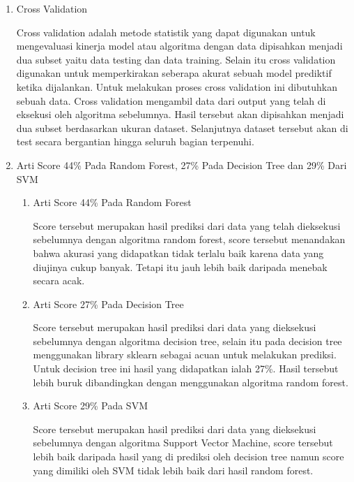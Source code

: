 \begin{enumerate}
\item Cross Validation \par
Cross validation adalah metode statistik yang dapat digunakan untuk mengevaluasi kinerja model atau algoritma dengan data dipisahkan menjadi dua subset yaitu data testing dan data training. Selain itu cross validation digunakan untuk memperkirakan seberapa akurat sebuah model prediktif ketika dijalankan. Untuk melakukan proses cross validation ini dibutuhkan sebuah data. Cross validation mengambil data dari output yang telah di eksekusi oleh algoritma sebelumnya. Hasil tersebut akan dipisahkan menjadi dua subset berdasarkan ukuran dataset. Selanjutnya dataset tersebut akan di test secara bergantian hingga seluruh bagian terpenuhi.

\item Arti Score 44\% Pada Random Forest, 27\% Pada Decision Tree dan 29\% Dari SVM \par
\begin{enumerate}
\item Arti Score 44\% Pada Random Forest \par
Score tersebut merupakan hasil prediksi dari data yang telah dieksekusi sebelumnya dengan algoritma random forest, score tersebut menandakan bahwa akurasi yang didapatkan tidak terlalu baik karena data yang diujinya cukup banyak. Tetapi itu jauh lebih baik daripada menebak secara acak.
\item Arti Score 27\% Pada Decision Tree \par
Score tersebut merupakan hasil prediksi dari data yang dieksekusi sebelumnya dengan algoritma decision tree, selain itu pada decision tree menggunakan library sklearn sebagai acuan untuk melakukan prediksi. Untuk decision tree ini hasil yang didapatkan ialah 27\%. Hasil tersebut lebih buruk dibandingkan dengan menggunakan algoritma random forest.
\item Arti Score 29\% Pada SVM \par
Score tersebut merupakan hasil prediksi dari data yang dieksekusi sebelumnya dengan algoritma Support Vector Machine, score tersebut lebih baik daripada hasil yang di prediksi oleh decision tree namun score yang dimiliki oleh SVM tidak lebih baik dari hasil random forest.
\end{enumerate}


\end{enumerate}
